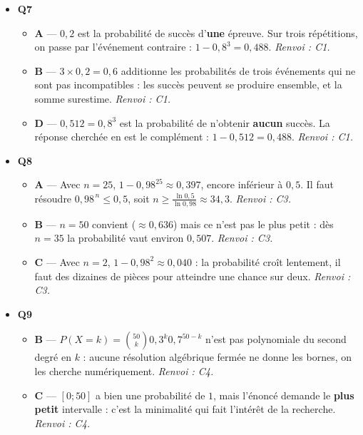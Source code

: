 \begin{itemize}
\begin{itemize}
    \item \textbf{C} — La variance intervient dans le majorant $V(Y)/\delta^2$, mais la quantité majorée est la probabilité d'un ecart a la moyenne. \emph{Renvoi : C10, inégalité de Bienaymé-Tchebychev.}
  \end{itemize}
  \item \textbf{Q7}
  \begin{itemize}
    \item \textbf{A} — $0{,}2$ est la probabilité de succès d'\textbf{une} épreuve. Sur trois répétitions, on passe par l'événement contraire : $1-0{,}8^3=0{,}488$. \emph{Renvoi : C1.}
    \item \textbf{B} — $3\times0{,}2=0{,}6$ additionne les probabilités de trois événements qui ne sont pas incompatibles : les succès peuvent se produire ensemble, et la somme surestime. \emph{Renvoi : C1.}
    \item \textbf{D} — $0{,}512=0{,}8^3$ est la probabilité de n'obtenir \textbf{aucun} succès. La réponse cherchée en est le complément : $1-0{,}512=0{,}488$. \emph{Renvoi : C1.}
  \end{itemize}
  \item \textbf{Q8}
  \begin{itemize}
    \item \textbf{A} — Avec $n=25$, $1-0{,}98^{25}\approx0{,}397$, encore inférieur à $0{,}5$. Il faut résoudre $0{,}98^{\,n}\leq0{,}5$, soit $n\geq\tfrac{\ln0{,}5}{\ln0{,}98}\approx34{,}3$. \emph{Renvoi : C3.}
    \item \textbf{B} — $n=50$ convient ($\approx0{,}636$) mais ce n'est pas le plus petit : dès $n=35$ la probabilité vaut environ $0{,}507$. \emph{Renvoi : C3.}
    \item \textbf{C} — Avec $n=2$, $1-0{,}98^2\approx0{,}040$ : la probabilité croît lentement, il faut des dizaines de pièces pour atteindre une chance sur deux. \emph{Renvoi : C3.}
  \end{itemize}
  \item \textbf{Q9}
  \begin{itemize}
    \item \textbf{B} — $P(X=k)=\binom{50}{k}0{,}3^k0{,}7^{50-k}$ n'est pas polynomiale du second degré en $k$ : aucune résolution algébrique fermée ne donne les bornes, on les cherche numériquement. \emph{Renvoi : C4.}
    \item \textbf{C} — $[0;50]$ a bien une probabilité de $1$, mais l'énoncé demande le \textbf{plus petit} intervalle : c'est la minimalité qui fait l'intérêt de la recherche. \emph{Renvoi : C4.}

\end{itemize}
\end{itemize}
